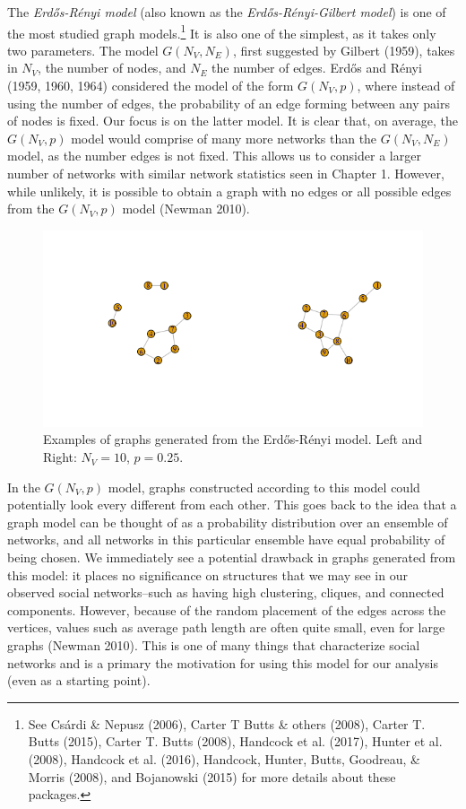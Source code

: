 \documentclass[12pt,twoside]{amherstthesis}
\begin{document}
  The \emph{Erdős-Rényi model} (also known as the
  \emph{Erdős-Rényi-Gilbert model}) is one of the most studied graph
  models.\footnote{See Csárdi \& Nepusz (2006), Carter T Butts \& others
    (2008), Carter T. Butts (2015), Carter T. Butts (2008), Handcock et
    al. (2017), Hunter et al. (2008), Handcock et al. (2016), Handcock,
    Hunter, Butts, Goodreau, \& Morris (2008), and Bojanowski (2015) for
    more details about these packages.} It is also one of the simplest, as
  it takes only two parameters. The model \(G(N_V, N_E)\), first suggested
  by Gilbert (1959), takes in \(N_V\), the number of nodes, and \(N_E\)
  the number of edges. Erdős and Rényi (1959, 1960, 1964) considered the
  model of the form \(G(N_{V}, p)\), where instead of using the number of
  edges, the probability of an edge forming between any pairs of nodes is
  fixed. Our focus is on the latter model. It is clear that, on average,
  the \(G(N_{V}, p)\) model would comprise of many more networks than the
  \(G(N_V, N_E)\) model, as the number edges is not fixed. This allows us
  to consider a larger number of networks with similar network statistics
  seen in Chapter 1. However, while unlikely, it is possible to obtain a
  graph with no edges or all possible edges from the \(G(N_{V}, p)\) model
  (Newman 2010).
  
  \begin{figure}[htbp]
  \centering
  \includegraphics{figure/21erdosrenyiexample.png}
  \caption{Examples of graphs generated from the Erdős-Rényi model. Left
  and Right: \(N_V = 10\), \(p = 0.25\).}
  \end{figure}
  
  In the \(G(N_{V}, p)\) model, graphs constructed according to this model
  could potentially look every different from each other. This goes back
  to the idea that a graph model can be thought of as a probability
  distribution over an ensemble of networks, and all networks in this
  particular ensemble have equal probability of being chosen. We
  immediately see a potential drawback in graphs generated from this
  model: it places no significance on structures that we may see in our
  observed social networks--such as having high clustering, cliques, and
  connected components. However, because of the random placement of the
  edges across the vertices, values such as average path length are often
  quite small, even for large graphs (Newman 2010). This is one of many
  things that characterize social networks and is a primary the motivation
  for using this model for our analysis (even as a starting point).
  
\end{document}
